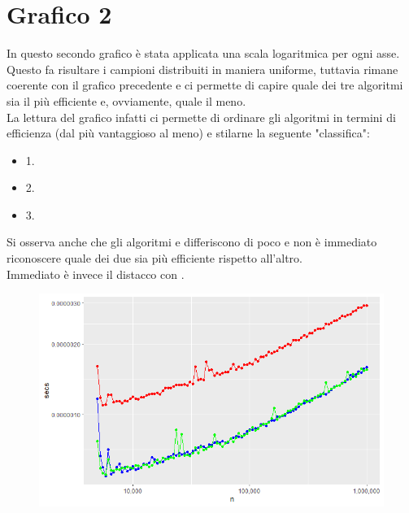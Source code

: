 \documentclass[a4paper,11pt]{report}
\begin{document}
    \section{Grafico 2}
    In questo secondo grafico è stata applicata una scala logaritmica per ogni asse. Questo fa risultare i campioni distribuiti in maniera uniforme, tuttavia rimane coerente con il grafico precedente e ci permette di capire quale dei tre algoritmi sia il più efficiente e, ovviamente, quale il meno.
    \vspace{0,5cm}
    \\La lettura del grafico infatti ci permette di ordinare gli algoritmi in termini di efficienza (dal più vantaggioso al meno) e stilarne la seguente "classifica":
    \begin{itemize}
        \item 1. {\color{Blue}{BST}}
        \item 2. {\color{Green}{RBT}}
        \item 3. {\color{Red}{AVL}}
    \end{itemize}
    Si osserva anche che gli algoritmi  {\color{Blue}{BST}} e {\color{Green}{RBT}} differiscono di poco e non è immediato riconoscere quale dei due sia più efficiente rispetto all'altro.
    \\Immediato è invece il distacco con {\color{Red}{AVL}}.
    \begin{figure}[h!]
        \begin{center}
            \includegraphics[width=17cm]{img/giusto2}\\
        \end{center}
    \end{figure}
\end{document}
